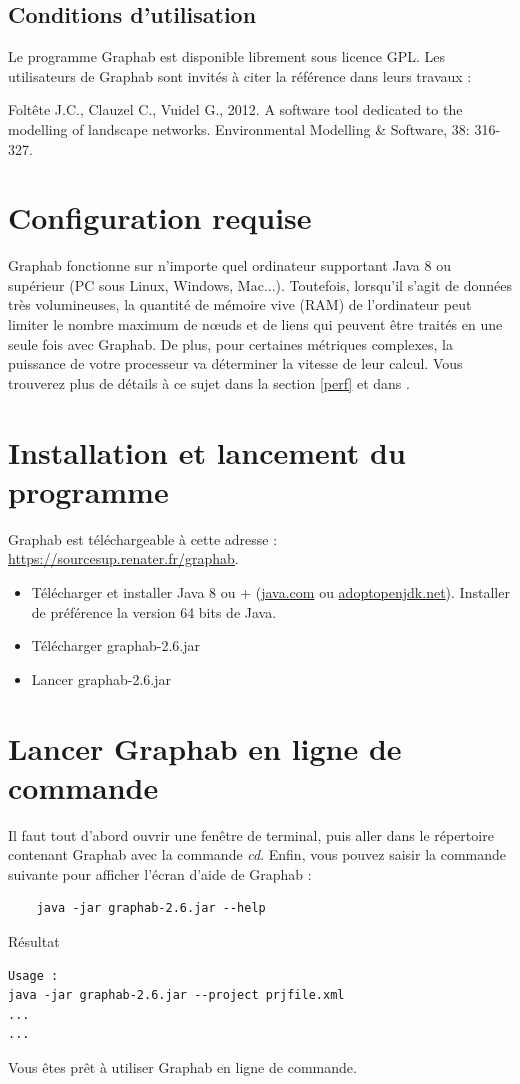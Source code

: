 \documentclass[a4paper,10pt]{report}
\begin{document}
\subsection{Conditions d’utilisation}
Le programme Graphab est disponible librement sous licence GPL. Les utilisateurs de Graphab sont invités à citer la référence \cite{2012_graphab_EMS} dans leurs travaux :

Foltête J.C., Clauzel C., Vuidel G., 2012. A software tool dedicated to the modelling of landscape networks. Environmental Modelling \& Software, 38: 316-327.


\section{Configuration requise}

Graphab fonctionne sur n'importe quel ordinateur supportant Java 8 ou supérieur (PC sous Linux, Windows, Mac...). Toutefois, lorsqu'il s'agit de données très volumineuses, la quantité de mémoire vive (RAM) de l’ordinateur peut limiter le nombre maximum de nœuds et de liens qui peuvent être traités en une seule fois avec Graphab. De plus, pour certaines métriques complexes, la puissance de votre processeur va déterminer la vitesse de leur calcul. Vous trouverez plus de détails à ce sujet dans la section \ref{perf} et dans \cite{2012_graphab_EMS}.

\section{Installation et lancement du programme}

Graphab est téléchargeable à cette adresse : \url{https://sourcesup.renater.fr/graphab}.

\begin{itemize}
	\item Télécharger et installer Java 8 ou + (\href{http://www.java.com}{java.com} ou \href{https://adoptopenjdk.net}{adoptopenjdk.net}). Installer de préférence la version 64 bits de Java.
	\item Télécharger graphab-2.6.jar
	\item Lancer graphab-2.6.jar
\end{itemize}

\section{Lancer Graphab en ligne de commande}
Il faut tout d'abord ouvrir une fenêtre de terminal, puis aller dans le répertoire contenant Graphab avec la commande \textit{cd}.
Enfin, vous pouvez saisir la commande suivante pour afficher l'écran d'aide de Graphab :
\begin{Verbatim}
	java -jar graphab-2.6.jar --help
\end{Verbatim}
Résultat
\begin{Verbatim}
Usage :
java -jar graphab-2.6.jar --project prjfile.xml
...
...
\end{Verbatim}
Vous êtes prêt à utiliser Graphab en ligne de commande.
\end{document}
